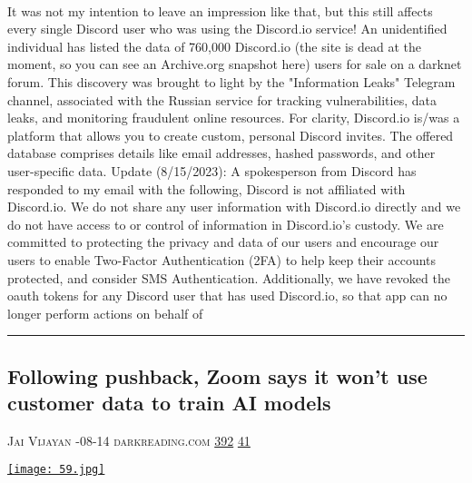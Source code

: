 \documentclass[10pt,a4paper]{article}
\begin{document}
\begin{multicols}{2}
\paragraph{}
 It was not my intention to leave an impression like that, but this still affects every single Discord user who was using the Discord.io service!
An unidentified individual has listed the data of 760,000 Discord.io (the site is dead at the moment, so you can see an Archive.org snapshot here) users for sale on a darknet forum. This discovery was brought to light by the "Information Leaks" Telegram channel, associated with the Russian service for tracking vulnerabilities, data leaks, and monitoring fraudulent online resources.
For clarity, Discord.io is/was a platform that allows you to create custom, personal Discord invites. The offered database comprises details like email addresses, hashed passwords, and other user-specific data.
Update (8/15/2023): A spokesperson from Discord has responded to my email with the following,
Discord is not affiliated with Discord.io. We do not share any user information with Discord.io directly and we do not have access to or control of information in Discord.io's custody.
We are committed to protecting the privacy and data of our users and encourage our users to enable Two-Factor Authentication (2FA) to help keep their accounts protected, and consider SMS Authentication.
Additionally, we have revoked the oauth tokens for any Discord user that has used Discord.io, so that app can no longer perform actions on behalf of 
\par\noindent\textcolor{red}{\rule{\linewidth}{0.2mm}}
\vfill
\null
\noindent\begin{minipage}{\linewidth}
\subsection{Following pushback, Zoom says it won't use customer data to train AI models}
\textsc{\footnotesize
{\scriptsize\faUser}\space 
Jai Vijayan 
{\scriptsize\faCalendar}-08-14 
{\scriptsize\faGlobe}\space 
darkreading.com 
{\scriptsize\faThumbsOUp}\space 
\href{http://news.ycombinator.com/item?id=37123572\&utm\_term=comment}{392} 
{\scriptsize\faComments}\space 
\href{http://news.ycombinator.com/item?id=37123572\&utm\_term=comment}{41} 
}
\par\medskip\noindent
\href{https://www.darkreading.com/analytics/following-pushback-zoom-says-it-won-t-use-customer-data-to-train-ai-models?utm\_source=hackernewsletter\&utm\_medium=email\&utm\_term=startup\_news}{
    \texttt{[image: 59.jpg]}
}
\end{minipage}

\end{multicols}
\end{document}
